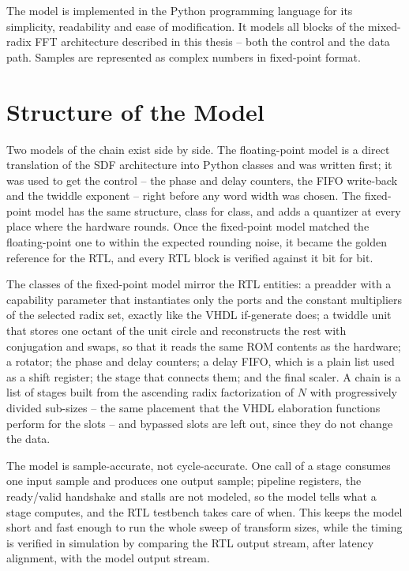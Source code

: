 \documentclass[a4paper,12pt, master]{etf}
\begin{document}
The model is implemented in the Python programming language for its simplicity, readability and ease of modification. It models all blocks of the mixed-radix FFT architecture described in this thesis -- both the control and the data path. Samples are represented as complex numbers in fixed-point format.

\section{Structure of the Model}

Two models of the chain exist side by side. The floating-point model is a direct translation of the SDF architecture into Python classes and was written first; it was used to get the control -- the phase and delay counters, the FIFO write-back and the twiddle exponent -- right before any word width was chosen. The fixed-point model has the same structure, class for class, and adds a quantizer at every place where the hardware rounds. Once the fixed-point model matched the floating-point one to within the expected rounding noise, it became the golden reference for the RTL, and every RTL block is verified against it bit for bit.

The classes of the fixed-point model mirror the RTL entities: a preadder with a capability parameter that instantiates only the ports and the constant multipliers of the selected radix set, exactly like the VHDL if-generate does; a twiddle unit that stores one octant of the unit circle and reconstructs the rest with conjugation and swaps, so that it reads the same ROM contents as the hardware; a rotator; the phase and delay counters; a delay FIFO, which is a plain list used as a shift register; the stage that connects them; and the final scaler. A chain is a list of stages built from the ascending radix factorization of $N$ with progressively divided sub-sizes -- the same placement that the VHDL elaboration functions perform for the slots -- and bypassed slots are left out, since they do not change the data.

The model is sample-accurate, not cycle-accurate. One call of a stage consumes one input sample and produces one output sample; pipeline registers, the ready/valid handshake and stalls are not modeled, so the model tells what a stage computes, and the RTL testbench takes care of when. This keeps the model short and fast enough to run the whole sweep of transform sizes, while the timing is verified in simulation by comparing the RTL output stream, after latency alignment, with the model output stream.
\end{document}
